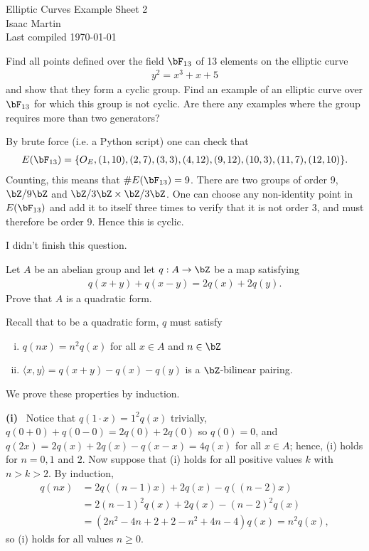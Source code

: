 


\pagestyle{empty}
	\LARGE
\begin{center}
	Elliptic Curves Example Sheet 2\\
	\Large
	Isaac Martin \\
    Last compiled \today
\end{center}
\normalsize
\vspace{-2mm}
\hru

\begin{homework}[e]
	\prob Find all points defined over the field $\bF_{13}$ of 13 elements on the elliptic curve
	\begin{align*}
		y^2 = x^3 + x + 5
	\end{align*}
	and show that they form a cyclic group. Find an example of an elliptic curve over $\bF_{13}$ for which this group is not cyclic. Are there any examples where the group requires more than two generators?
	\begin{prf}
		By brute force (i.e. a Python script) one can check that
		\begin{align*}
			E(\bF_{13}) = \{O_E, (1, 10), (2, 7), (3, 3), (4, 12), (9, 12), (10, 3), (11, 7), (12, 10)\}.
		\end{align*}
		Counting, this means that $\#E(\bF_{13}) = 9$. There are two groups of order 9, $\bZ/9\bZ$ and $\bZ/3\bZ \times \bZ/3\bZ$. One can choose any non-identity point in $E(\bF_{13})$ and add it to itself three times to verify that it is not order 3, and must therefore be order 9. Hence this is cyclic.

		I didn't finish this question.
	\end{prf}
	\prob Let $A$ be an abelian group and let $q:A\to \bZ$ be a map satisfying
	\begin{align*}
		q(x+y)+q(x-y) = 2q(x)+2q(y).
	\end{align*}
	Prove that $A$ is a quadratic form.
	\begin{prf}
		Recall that to be a quadratic form, $q$ must satisfy
		\begin{enumerate}[(i)]
			\item $q(nx) = n^2q(x)$ for all $x \in A$ and $n \in \bZ$ 
			\item $\langle x,y\rangle = q(x+y)-q(x)-q(y)$ is a $\bZ$-bilinear pairing.
		\end{enumerate}
        We prove these properties by induction.
		
		\bigskip

        \noindent \textbf{(i)}~ Notice that $q(1\cdot x) = 1^2q(x)$ trivially, $q(0+0) + q(0-0) = 2q(0)+2q(0)$ so $q(0) = 0$, and $q(2x) = 2q(x) + 2q(x) - q(x - x) = 4q(x)$ for all $x\in A$; hence, (i) holds for $n = 0,1$ and $2$. Now suppose that (i) holds for all positive values $k$ with $n > k > 2$. By induction,
		\begin{align*}
			q(nx) &= 2q((n-1)x) + 2q(x) - q((n-2)x) \\
				  &= 2(n-1)^2q(x) + 2q(x) - (n-2)^2q(x) \\
				  &= (2n^2 - 4n + 2 + 2 - n^2 + 4n - 4)q(x) = n^2q(x),
		\end{align*}
		so (i) holds for all values $n \geq 0$. 


\end{prf}
\end{homework}
